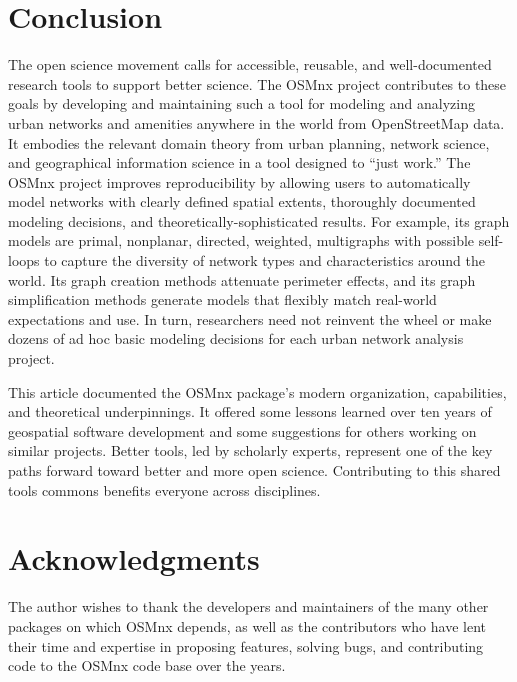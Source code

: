 \documentclass[12pt,letterpaper]{article} %
\begin{document}
\section{Conclusion}

The open science movement calls for accessible, reusable, and well-documented research tools to support better science. The OSMnx project contributes to these goals by developing and maintaining such a tool for modeling and analyzing urban networks and amenities anywhere in the world from OpenStreetMap data. It embodies the relevant domain theory from urban planning, network science, and geographical information science in a tool designed to \enquote{just work.} The OSMnx project improves reproducibility by allowing users to automatically model networks with clearly defined spatial extents, thoroughly documented modeling decisions, and theoretically-sophisticated results. For example, its graph models are primal, nonplanar, directed, weighted, multigraphs with possible self-loops to capture the diversity of network types and characteristics around the world. Its graph creation methods attenuate perimeter effects, and its graph simplification methods generate models that flexibly match real-world expectations and use. In turn, researchers need not reinvent the wheel or make dozens of ad hoc basic modeling decisions for each urban network analysis project.

This article documented the OSMnx package's modern organization, capabilities, and theoretical underpinnings. It offered some lessons learned over ten years of geospatial software development and some suggestions for others working on similar projects. Better tools, led by scholarly experts, represent one of the key paths forward toward better and more open science. Contributing to this shared tools commons benefits everyone across disciplines.

\section*{Acknowledgments}

The author wishes to thank the developers and maintainers of the many other packages on which OSMnx depends, as well as the contributors who have lent their time and expertise in proposing features, solving bugs, and contributing code to the OSMnx code base over the years.


\setlength{\bibsep}{0.00cm plus 0.05cm} %


\end{document}
